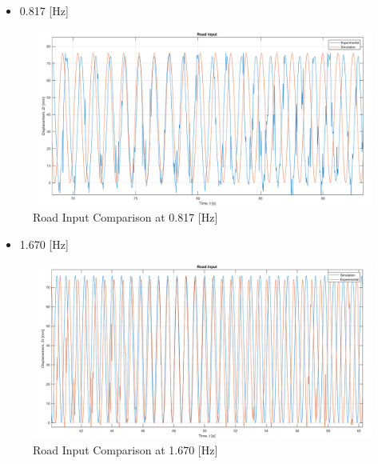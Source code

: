 \begin{itemize}
	\item 0.817 [Hz]
\end{itemize}
\begin{figure}[H]
	\centering
	\includegraphics[width=0.99\linewidth]{figures/0.817 RI.png}
	\caption{Road Input Comparison at 0.817 [Hz]}
	\label{fig:Road Input Comparison at 0.817}
\end{figure}
\begin{itemize}
	\item 1.670 [Hz]
\end{itemize}
\begin{figure}[H]
	\centering
	\includegraphics[width=0.99\linewidth]{figures/1.67 RI.png}
	\caption{Road Input Comparison at 1.670 [Hz]}
	\label{fig:Road Input Comparison at 1.670}
\end{figure}



